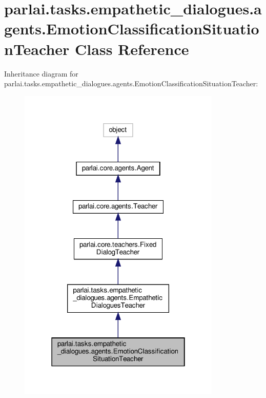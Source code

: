 \hypertarget{classparlai_1_1tasks_1_1empathetic__dialogues_1_1agents_1_1EmotionClassificationSituationTeacher}{}\section{parlai.\+tasks.\+empathetic\+\_\+dialogues.\+agents.\+Emotion\+Classification\+Situation\+Teacher Class Reference}
\label{classparlai_1_1tasks_1_1empathetic__dialogues_1_1agents_1_1EmotionClassificationSituationTeacher}


Inheritance diagram for parlai.\+tasks.\+empathetic\+\_\+dialogues.\+agents.\+Emotion\+Classification\+Situation\+Teacher\+:
\nopagebreak
\begin{figure}[H]
\begin{center}
\leavevmode
\includegraphics[width=274pt]{d4/df9/classparlai_1_1tasks_1_1empathetic__dialogues_1_1agents_1_1EmotionClassificationSituationTeacher__inherit__graph}
\end{center}
\end{figure}


